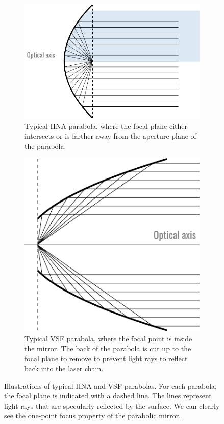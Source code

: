 \documentclass[11pt,SymmetricalJury]{inrsthesis/inrsthesis}
\begin{document}
\begin{figure}
  \begin{subfigure}[t]{0.47\textwidth}
    \centering
    \includegraphics{figs/parabola_hna.pdf}
    \caption{Typical HNA parabola, where the focal plane either intersects or is
            farther away from the aperture plane of the parabola.}
    \label{fig:vsf-v-hna.hna}
  \end{subfigure}
  \hfill
  \begin{subfigure}[t]{0.47\textwidth}
    \centering
    \includegraphics{figs/parabola_vsf.pdf}
    \caption{Typical VSF parabola, where the focal point is inside the
             mirror. The back of the parabola is cut up to the focal
             plane to remove to prevent light rays to reflect back
             into the laser chain.}
    \label{fig:vsf-v-hna.vsf}
  \end{subfigure}
  \caption[Illustrations of the typical HNA and VSF parabolas.]
          {Illustrations of typical HNA and VSF parabolas. For each
          parabola, the focal plane is indicated with a dashed line.
          The lines represent light rays that are specularly reflected
          by the surface. We can clearly see the one-point focus property
          of the parabolic mirror.}
  \label{fgi:vsf-v-hna}
\end{figure}
\end{document}
